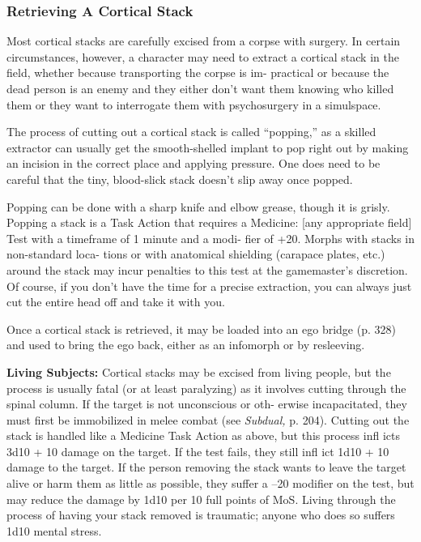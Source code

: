 \subsubsection{Retrieving A Cortical Stack}

Most cortical stacks are carefully excised from a 
corpse with surgery. In certain circumstances, however, 
a character may need to extract a cortical stack in the 
field, whether because transporting the corpse is im-
practical or because the dead person is an enemy and 
they either don't want them knowing who killed them 
or they want to interrogate them with psychosurgery 
in a simulspace.

The process of cutting out a cortical stack is called 
``popping,'' as a skilled extractor can usually get the 
smooth-shelled implant to pop right out by making 
an incision in the correct place and applying pressure. 
One does need to be careful that the tiny, blood-slick 
stack doesn't slip away once popped.

Popping can be done with a sharp knife and elbow 
grease, though it is grisly. Popping a stack is a Task 
Action that requires a Medicine: [any appropriate 
field] Test with a timeframe of 1 minute and a modi-
fier of +20. Morphs with stacks in non-standard loca-
tions or with anatomical shielding (carapace plates, 
etc.) around the stack may incur penalties to this test 
at the gamemaster's discretion. Of course, if you don't 
have the time for a precise extraction, you can always 
just cut the entire head off and take it with you.

Once a cortical stack is retrieved, it may be loaded 
into an ego bridge (p. 328) and used to bring the ego 
back, either as an infomorph or by resleeving.

\textbf{Living Subjects:} Cortical stacks may be excised 
from living people, but the process is usually fatal (or 
at least paralyzing) as it involves cutting through the 
spinal column. If the target is not unconscious or oth-
erwise incapacitated, they must first be immobilized 
in melee combat (see \textit{Subdual,} p. 204). Cutting out 
the stack is handled like a Medicine Task Action as 
above, but this process infl icts 3d10 + 10 damage on 
the target. If the test fails, they still infl ict 1d10 + 10 
damage to the target. If the person removing the stack 
wants to leave the target alive or harm them as little 
as possible, they suffer a –20 modifier on the test, but 
may reduce the damage by 1d10 per 10 full points of 
MoS. Living through the process of having your stack 
removed is traumatic; anyone who does so suffers 
1d10 mental stress.

